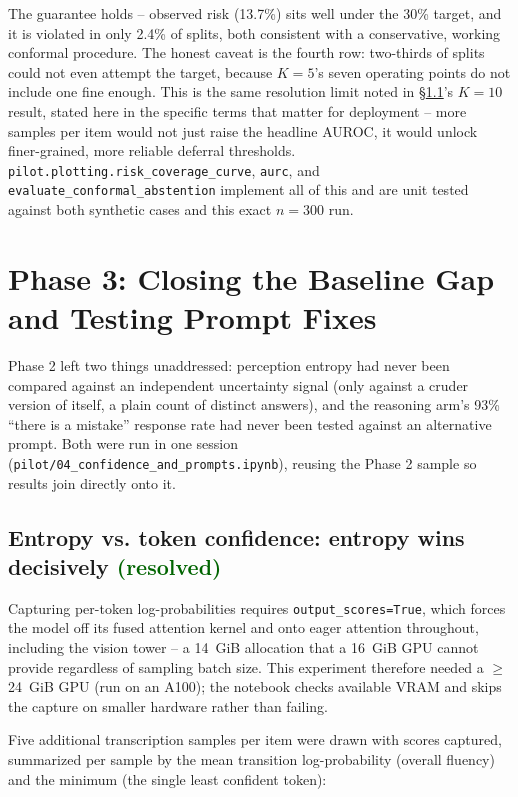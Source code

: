 \documentclass[11pt]{article}
\newcommand{\worked}[1]{\textcolor{darkgreen}{\textbf{#1}}}
\begin{document}
The guarantee holds -- observed risk (13.7\%) sits well under the 30\% target,
and it is violated in only 2.4\% of splits, both consistent with a
conservative, working conformal procedure. The honest caveat is the fourth
row: two-thirds of splits could not even attempt the target, because $K=5$'s
seven operating points do not include one fine enough. This is the same
resolution limit noted in \S\ref{sec:token-confidence}'s $K=10$ result, stated
here in the specific terms that matter for deployment -- more samples per
item would not just raise the headline AUROC, it would unlock finer-grained,
more reliable deferral thresholds. \texttt{pilot.plotting.risk\_coverage\_curve},
\texttt{aurc}, and \texttt{evaluate\_conformal\_abstention} implement all of
this and are unit tested against both synthetic cases and this exact $n=300$
run.

\section{Phase 3: Closing the Baseline Gap and Testing Prompt Fixes}
\label{sec:phase3}

Phase 2 left two things unaddressed: perception entropy had never been
compared against an independent uncertainty signal (only against a cruder
version of itself, a plain count of distinct answers), and the reasoning arm's
93\% ``there is a mistake'' response rate had never been tested against an
alternative prompt. Both were run in one session
(\texttt{pilot/04\_confidence\_and\_prompts.ipynb}), reusing the Phase 2
sample so results join directly onto it.

\subsection{Entropy vs. token confidence: entropy wins decisively \worked{(resolved)}}
\label{sec:token-confidence}

Capturing per-token log-probabilities requires \texttt{output\_scores=True},
which forces the model off its fused attention kernel and onto eager
attention throughout, including the vision tower -- a 14~GiB allocation that
a 16~GiB GPU cannot provide regardless of sampling batch size. This experiment
therefore needed a $\geq$24~GiB GPU (run on an A100); the notebook checks
available VRAM and skips the capture on smaller hardware rather than failing.

Five additional transcription samples per item were drawn with scores
captured, summarized per sample by the mean transition log-probability
(overall fluency) and the minimum (the single least confident token):
\end{document}
